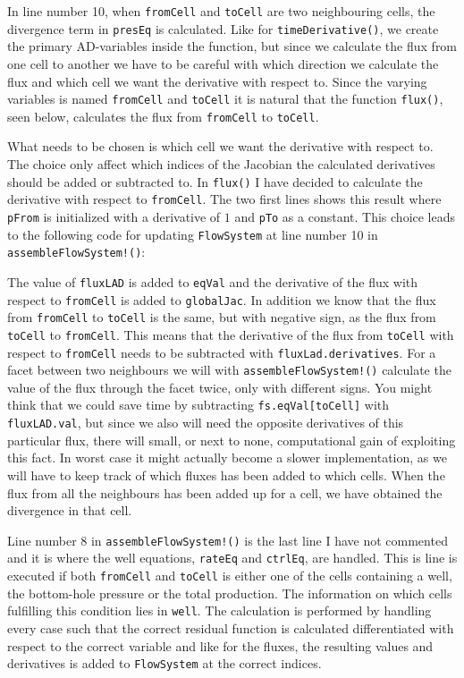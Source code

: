 In line number 10, when \texttt{fromCell} and \texttt{toCell} are two neighbouring cells, the divergence term in \texttt{presEq} is calculated. Like for \texttt{timeDerivative()}, we create the primary AD-variables inside the function, but since we calculate the flux from one cell to another we have to be careful with which direction we calculate the flux and which cell we want the derivative with respect to. Since the varying variables is named \texttt{fromCell} and \texttt{toCell} it is natural that the function \texttt{flux()}, seen below, calculates the flux from \texttt{fromCell} to \texttt{toCell}. 

What needs to be chosen is which cell we want the derivative with respect to. The choice only affect which indices of the Jacobian the calculated derivatives should be added or subtracted to. In \texttt{flux()} I have decided to calculate the derivative with respect to \texttt{fromCell}. The two first lines shows this result where \texttt{pFrom} is initialized with a derivative of $1$ and \texttt{pTo} as a constant. This choice leads to the following code for updating \texttt{FlowSystem} at line number 10 in \texttt{assembleFlowSystem!()}:

The value of \texttt{fluxLAD} is added to \texttt{eqVal} and the derivative of the flux with respect to \texttt{fromCell} is added to \texttt{globalJac}. In addition we know that the flux from \texttt{fromCell} to \texttt{toCell} is the same, but with negative sign, as the flux from \texttt{toCell} to \texttt{fromCell}. This means that the derivative of the flux from \texttt{toCell} with respect to \texttt{fromCell} needs to be subtracted with \texttt{fluxLad.derivatives}. For a facet between two neighbours we will with \texttt{assembleFlowSystem!()} calculate the value of the flux through the facet twice, only with different signs. You might think that we could save time by subtracting \texttt{fs.eqVal[toCell]} with \texttt{fluxLAD.val}, but since we also will need the opposite derivatives of this particular flux, there will small, or next to none, computational gain of exploiting this fact. In worst case it might actually become a slower implementation, as we will have to keep track of which fluxes has been added to which cells. When the flux from all the neighbours has been added up for a cell, we have obtained the divergence in that cell. 

Line number 8 in \texttt{assembleFlowSystem!()} is the last line I have not commented and it is where the well equations, \texttt{rateEq} and \texttt{ctrlEq}, are handled. This is line is executed if both \texttt{fromCell} and \texttt{toCell} is either one of the cells containing a well, the bottom-hole pressure or the total production. The information on which cells fulfilling this condition lies in \texttt{well}. The calculation is performed by handling every case such that the correct residual function is calculated differentiated with respect to the correct variable and like for the fluxes, the resulting values and derivatives is added to \texttt{FlowSystem} at the correct indices. 

